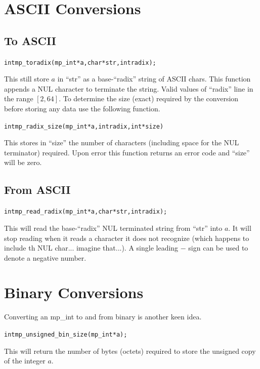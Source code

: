 \documentclass[synpaper]{book}
\begin{document}
\section{ASCII Conversions}
\subsection{To ASCII}
\begin{alltt}
int mp_toradix (mp_int * a, char *str, int radix);
\end{alltt}
This still store $a$ in ``str'' as a base-``radix'' string of ASCII chars.  This function appends a NUL character
to terminate the string.  Valid values of ``radix'' line in the range $[2, 64]$.  To determine the size (exact) required
by the conversion before storing any data use the following function.

\begin{alltt}
int mp_radix_size (mp_int * a, int radix, int *size)
\end{alltt}
This stores in ``size'' the number of characters (including space for the NUL terminator) required.  Upon error this 
function returns an error code and ``size'' will be zero.  

\subsection{From ASCII}
\begin{alltt}
int mp_read_radix (mp_int * a, char *str, int radix);
\end{alltt}
This will read the base-``radix'' NUL terminated string from ``str'' into $a$.  It will stop reading when it reads a
character it does not recognize (which happens to include th NUL char... imagine that...).  A single leading $-$ sign
can be used to denote a negative number.

\section{Binary Conversions}

Converting an mp\_int to and from binary is another keen idea.

\begin{alltt}
int mp_unsigned_bin_size(mp_int *a);
\end{alltt}

This will return the number of bytes (octets) required to store the unsigned copy of the integer $a$.
\end{document}
